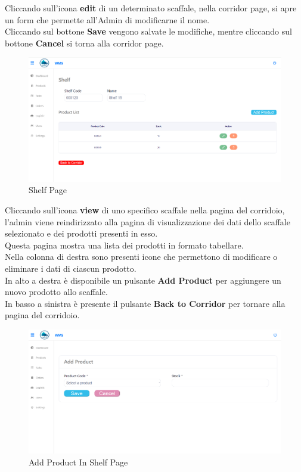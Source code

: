 Cliccando sull'icona \textbf{edit} di un determinato scaffale, nella corridor page, si apre un form
che permette all'Admin di modificarne il nome.\\
Cliccando sul bottone \textbf{Save} vengono salvate le modifiche, mentre cliccando sul bottone \textbf{Cancel} si torna alla corridor page.

\begin{figure}[H]
    \centering
    \includegraphics[width=\textwidth]{document/sections/img/Storyboard/viewShelf.png}
    \caption{Shelf Page}
    \label{fig:shelfPage}
\end{figure}

Cliccando sull'icona \textbf{view} di uno specifico scaffale nella pagina del corridoio, l'admin viene reindirizzato alla pagina di visualizzazione dei dati dello scaffale selezionato e dei prodotti presenti in esso.\\
Questa pagina mostra una lista dei prodotti in formato tabellare.\\
Nella colonna di destra sono presenti icone che permettono di modificare o eliminare i dati di ciascun prodotto.\\
In alto a destra è disponibile un pulsante \textbf{Add Product} per aggiungere un nuovo prodotto allo scaffale.\\
In basso a sinistra è presente il pulsante \textbf{Back to Corridor} per tornare alla pagina del corridoio.

\begin{figure}[H]
    \centering
    \includegraphics[width=\textwidth]{document/sections/img/Storyboard/addProductInShelf.png}
    \caption{Add Product In Shelf Page}
    \label{fig:addProductInShelfPage}
\end{figure}

